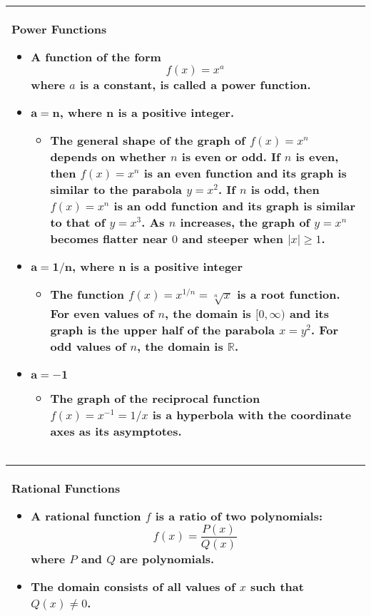 \documentclass[fleqn]{article}
\begin{document}
\begin{center}
\def\arraystretch{1.3}
{\setlength{\tabcolsep}{16pt}
\begin{tabularx}{.9\textwidth}{|X|}
\hline
	\vspace{1pt}
	\textbf{Power Functions}
	\begin{itemize}
	\item A function of the form 
	$$f(x) = x^a$$
	where $a$ is a constant, is called a \textbf{power function}.
	\item \textbf{$\bm{a=n}$, where $\bm{n}$ is a positive integer}.
	\begin{itemize}
		\item The general shape of the graph of $f(x) = x^n$ depends on whether $n$ is even or odd. If $n$ is even, then $f(x) = x^n$ is an even function and its graph is similar to the parabola $y = x^2$. If $n$ is odd, then $f(x) = x^n$ is an odd function and its graph is similar to that of $y = x^3$. As $n$ increases, the graph of $y = x^n$ becomes flatter near $0$ and steeper when $|x| \geq 1$.
	\end{itemize}
	\item \textbf{$\bm{a = 1/n}$, where $\bm{n}$ is a positive integer}
	\begin{itemize}
		\item The function $f(x) = x^{1/n} = \sqrt[n]{x}$ is a \textbf{root function}. For even values of $n$, the domain is $[0, \infty)$ and its graph is the upper half of the parabola $x = y^2$. For odd values of $n$, the domain is $\mathbb{R}$.
	\end{itemize}
	\item \textbf{$\bm{a = -1}$}
	\begin{itemize}
		\item The graph of the \textbf{reciprocal function} $f(x) = x^{-1} = 1/x$ is a hyperbola with the coordinate axes as its asymptotes.
	\end{itemize}
	\end{itemize} \\
\hline
\end{tabularx}}
\vspace{12pt}	

\def\arraystretch{1.3}
{\setlength{\tabcolsep}{16pt}
\begin{tabularx}{.9\textwidth}{|X|}
\hline
	\vspace{1pt}
	\textbf{Rational Functions}
	\begin{itemize}
	\item A \textbf{rational function} $f$ is a ratio of two polynomials:
	$$f(x) = \dfrac{P(x)}{Q(x)}$$
	where $P$ and $Q$ are polynomials.
	\item The domain consists of all values of $x$ such that $Q(x) \ne 0$.
	\end{itemize} \\
\hline
\end{tabularx}}
\vspace{12pt}	


\end{center}
\end{document}
